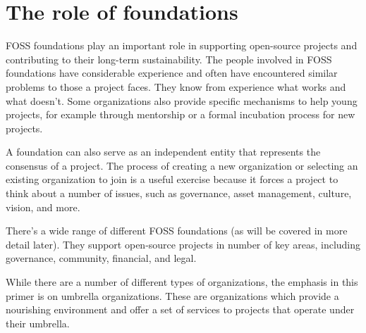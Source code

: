


\chapter{The role of foundations}

FOSS foundations play an important role in supporting open-source projects and contributing to their long-term sustainability.  The people involved in FOSS foundations have considerable experience and often have encountered similar problems to those a project faces.  They know from experience what works and what doesn't.  Some organizations also provide specific mechanisms to help young projects, for example through mentorship or a formal incubation process for new projects.

A foundation can also serve as an independent entity that represents the consensus of a project.  The process of creating a new organization or selecting an existing organization to join is a useful exercise because it forces a project to think about a number of issues, such as governance, asset management, culture, vision, and more.

There's a wide range of different FOSS foundations (as will be covered in more detail later).  They support open-source projects in number of key areas, including governance, community, financial, and legal.

While there are a number of different types of organizations, the emphasis in this primer is on umbrella organizations.  These are organizations which provide a nourishing environment and offer a set of services to projects that operate under their umbrella.

